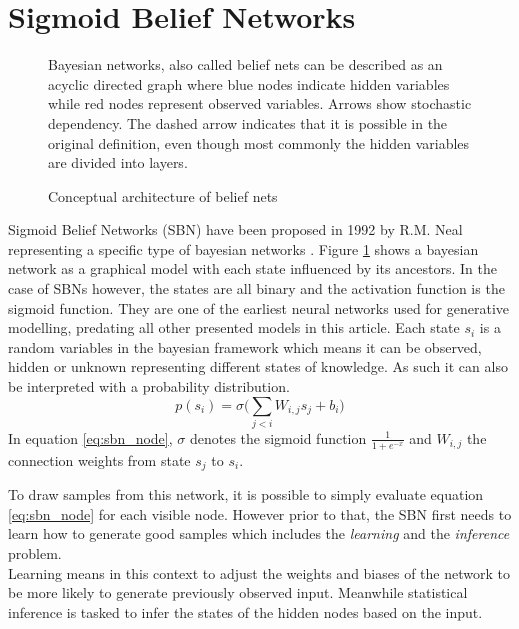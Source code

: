 \section{Sigmoid Belief Networks}
\label{sec:sbn}
\begin{figure}[htb]
\centering

  \caption{Conceptual architecture of belief nets}
  \label{fig:sbn_arch}
  \medskip
  \small
  Bayesian networks, also called belief nets can be described as an acyclic directed graph where blue nodes indicate hidden variables while red nodes represent observed variables.
  Arrows show stochastic dependency. The dashed arrow indicates that it is possible in the original definition, even though most commonly the hidden variables are divided into layers.
\end{figure}

Sigmoid Belief Networks (SBN) have been proposed in 1992 by R.M. Neal \cite{neal:1992} representing a specific type of bayesian networks \cite{pearl:1985}.
Figure \ref{fig:sbn_arch} shows a bayesian network as a graphical model with each state influenced by its ancestors.
In the case of SBNs however, the states are all binary and the activation function is the sigmoid function. They are one of the earliest neural networks used for generative modelling, predating all other presented models in this article.
Each state $s_i$ is a random variables in the bayesian framework which means it can be observed, hidden or unknown representing different states of knowledge. As such it can also be interpreted with a probability distribution.
\begin{equation}
  \label{eq:sbn_node}
p(s_i) = \sigma\bigg(\sum_{j<i}W_{i,j}s_j+b_i\bigg)
\end{equation}
In equation \ref{eq:sbn_node}, $\sigma$ denotes the sigmoid function $\frac{1}{1 + e^{-x}}$ and $W_{i,j}$ the connection weights from state $s_j$ to $s_i$.

To draw samples from this network, it is possible to simply evaluate equation \ref{eq:sbn_node} for each visible node.
However prior to that, the SBN first needs to learn how to generate good samples which includes the \emph{learning} and the \emph{inference} problem.\\
Learning means in this context to adjust the weights and biases of the network to be more likely to generate previously observed input.
Meanwhile statistical inference is tasked to infer the states of the hidden nodes based on the input.\\\\

